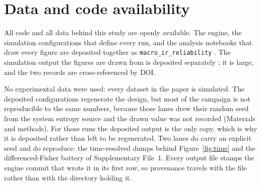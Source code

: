 \section*{Data and code availability}
All code and all data behind this study are openly available. The engine, the simulation
configurations that define every run, and the analysis notebooks that draw every figure are
deposited together as \texttt{macro\_ir\_reliability} \citep{moffatt2026code}. The simulation
output the figures are drawn from is deposited separately \citep{moffatt2026data}; it is large,
and the two records are cross-referenced by DOI.

No experimental data were used: every dataset in the paper is simulated. The deposited
configurations regenerate the design, but most of the campaign is not reproducible to the same
numbers, because those lanes drew their random seed from the system entropy source and the drawn
value was not recorded (Materials and methods). For those runs the deposited output is the only
copy, which is why it is deposited rather than left to be regenerated. Two lanes do carry an
explicit seed and do reproduce: the time-resolved dumps behind Figure~\ref{fig:time} and the
differenced-Fisher battery of Supplementary File~1. Every output file stamps the engine commit
that wrote it in its first row, so provenance travels with the file rather than with the
directory holding it.

